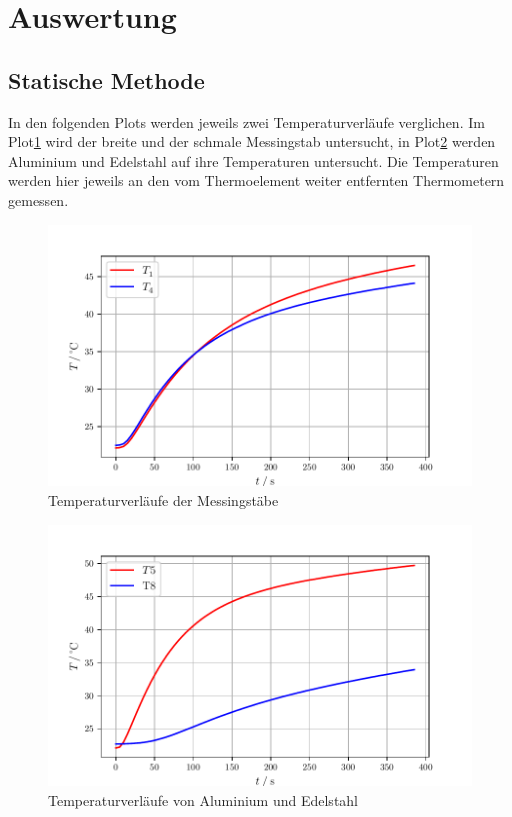 \section{Auswertung}
\label{sec:Auswertung}


\subsection{Statische Methode}
In den folgenden Plots werden jeweils zwei Temperaturverläufe verglichen. Im Plot\ref{fig:t1t4} wird der breite und der schmale 
Messingstab untersucht, in Plot\ref{fig:t5t8} werden Aluminium und Edelstahl auf ihre Temperaturen untersucht. Die Temperaturen werden hier jeweils
an den vom Thermoelement weiter entfernten Thermometern gemessen.

\begin{figure}
    \centering
    \includegraphics[width=\textwidth]{data/T1T4.pdf}
    \caption{Temperaturverläufe der Messingstäbe}
    \label{fig:t1t4}
\end{figure}

\begin{figure}
    \centering
    \includegraphics[width=\textwidth]{data/T5T8.pdf}
    \caption{Temperaturverläufe von Aluminium und Edelstahl}
    \label{fig:t5t8}
\end{figure}

